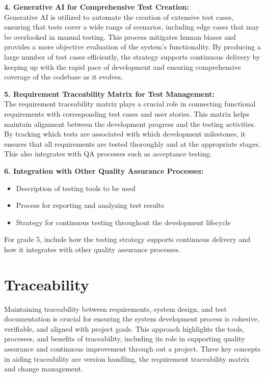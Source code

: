 \documentclass{article}
\begin{document}
\textbf{4. Generative AI for Comprehensive Test Creation:}\\
Generative AI is utilized to automate the creation of extensive test cases, ensuring that tests cover a wide range of scenarios, including edge cases that may be overlooked in manual testing. This process mitigates human biases and provides a more objective evaluation of the system’s functionality. By producing a large number of test cases efficiently, the strategy supports continuous delivery by keeping up with the rapid pace of development and ensuring comprehensive coverage of the codebase as it evolves.

\textbf{5. Requirement Traceability Matrix for Test Management:}\\
The requirement traceability matrix plays a crucial role in connecting functional requirements with corresponding test cases and user stories. This matrix helps maintain alignment between the development progress and the testing activities. By tracking which tests are associated with which development milestones, it ensures that all requirements are tested thoroughly and at the appropriate stages. This also integrates with QA processes such as acceptance testing.

\textbf{6. Integration with Other Quality Assurance Processes:}\\

\begin{itemize}
    \item Description of testing tools to be used
    \item Process for reporting and analyzing test results
    \item Strategy for continuous testing throughout the development lifecycle
\end{itemize}

For grade 5, include how the testing strategy supports continuous delivery and how it integrates with other quality assurance processes.

\newpage
\section{Traceability}

Maintaining traceability between requirements, system design, and test documentation is crucial for ensuring the system development process is cohesive, verifiable, and aligned with project goals. This approach highlights the tools, processes, and benefits of traceability, including its role in supporting quality assurance and continuous improvement through out a project. Three key concepts in aiding traceability are version handling, the requirement traceability matrix and change management.
\end{document}
